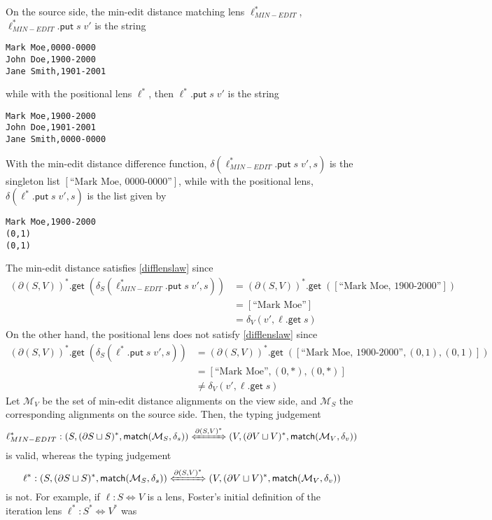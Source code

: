\documentclass[acmsmall,review,anonymous]{acmart}\settopmatter{printfolios=true,printccs=false,printacmref=false}
\theoremstyle{definition}
\newcommand{\kw}[1]{\ensuremath{\mathsf{#1}}\xspace}
\newcommand{\get}{\ensuremath{\kw{get}}\xspace}
\newcommand{\pput}{\ensuremath{\kw{put}}\xspace}
\newcommand{\match}{\ensuremath{\kw{match}}\xspace}
\begin{document}
On the source side, the min-edit distance matching lens $\ell^*_{MIN-EDIT}$,
$\ell^*_{MIN-EDIT}.\pput \; s \; v'$ is the string
\begin{lstlisting}
Mark Moe,0000-0000
John Doe,1900-2000
Jane Smith,1901-2001
\end{lstlisting}
while with the positional lens $\ell^*$, then $\ell^*.\pput \; s \; v'$ is the
string
\begin{lstlisting}
Mark Moe,1900-2000
John Doe,1901-2001
Jane Smith,0000-0000
\end{lstlisting}
With the min-edit distance difference function,
$\delta(\ell^*_{MIN-EDIT}.\pput \; s \; v', s)$ is the singleton list
$[\text{``Mark Moe, 0000-0000''}]$, while with the
positional lens, $\delta(\ell^*.\pput \; s \; v', s)$ is the list
given by
\begin{lstlisting}
Mark Moe,1900-2000
(0,1)
(0,1)
\end{lstlisting}
The min-edit distance satisfies \cref{difflenslaw} since
\begin{align*}
(\partial (S, V))^*.\get\; (\delta_S(\ell^*_{MIN-EDIT}.\pput \; s \; v', s)) &=
(\partial (S, V))^*.\get\; ([\text{``Mark Moe, 1900-2000''}])\\
&= [\text{``Mark Moe''}]\\
&=
\delta_V(v', \ell.\get \; s)
\end{align*}
On the other hand, the positional lens does not satisfy \cref{difflenslaw} since
\begin{align*}
(\partial (S, V))^*.\get\; (\delta_S(\ell^*.\pput \; s \; v', s)) &=
(\partial (S, V))^*.\get\; ([\text{``Mark Moe, 1900-2000''}, (0,1), (0,1)])\\
&=[\text{``Mark Moe''}, (0,*), (0,*)]\\
& \neq \delta_V(v', \ell.\get \; s)
\end{align*}
Let $\mathcal{M}_V$ be the set of min-edit distance alignments on the view side,
and $\mathcal{M}_S$ the corresponding alignments on the source side.
Then, the typing judgement
$$\ell^*_{MIN-EDIT}:(S, (\partial S \sqcup S)^*, \match(\mathcal{M}_S, \delta_s))
\xLeftrightarrow{\partial(S, V)^*} (V, (\partial V \sqcup V)^*, \match(\mathcal{M}_V, \delta_v))$$
is valid, whereas the typing judgement
$$\ell^*:(S, (\partial S \sqcup S)^*, \match(\mathcal{M}_S, \delta_s))
\xLeftrightarrow{\partial(S, V)^*} (V, (\partial V \sqcup V)^*, \match(\mathcal{M}_V, \delta_v))$$
is not.
\iffalse
For example, if $\ell : S \Leftrightarrow V$ is a lens, Foster's initial
definition of the iteration lens $\ell^* : S^* \Leftrightarrow V^*$ was
\end{document}
